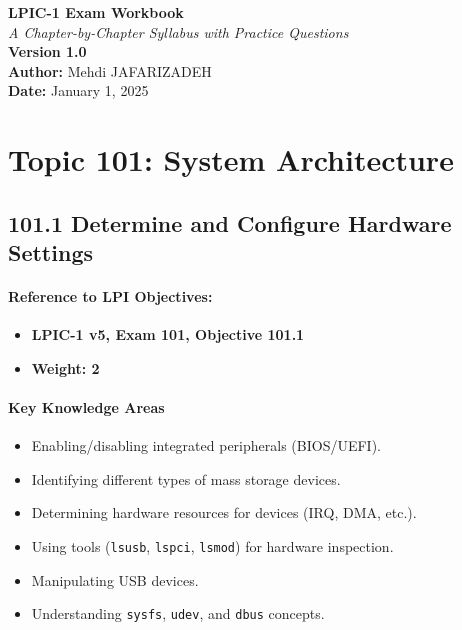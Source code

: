 \documentclass[12pt,a4paper]{report}
\begin{document}
\begin{titlepage}
    \centering
    \vspace*{3cm}
    {\Huge \textbf{LPIC-1 Exam Workbook}}\\
    \vspace{1cm}
    {\large \textit{A Chapter-by-Chapter Syllabus with Practice Questions}}\\
    \vfill
    {\large \textbf{Version 1.0}}\\
    \vspace{2cm}
    \vfill
    \textbf{Author:} Mehdi JAFARIZADEH \\
    \textbf{Date:} January 1, 2025
    \vspace{2cm}
\end{titlepage}

\tableofcontents
\newpage

\chapter{Topic 101: System Architecture}

\section{101.1 Determine and Configure Hardware Settings}

\subsubsection*{Reference to LPI Objectives:}
\begin{itemize}
    \item \textbf{LPIC-1 v5, Exam 101, Objective 101.1}
    \item \textbf{Weight: 2}
\end{itemize}

\subsubsection*{Key Knowledge Areas}
\begin{itemize}
    \item Enabling/disabling integrated peripherals (BIOS/UEFI).
    \item Identifying different types of mass storage devices.
    \item Determining hardware resources for devices (IRQ, DMA, etc.).
    \item Using tools (\texttt{lsusb}, \texttt{lspci}, \texttt{lsmod}) for hardware inspection.
    \item Manipulating USB devices.
    \item Understanding \texttt{sysfs}, \texttt{udev}, and \texttt{dbus} concepts.
\end{itemize}
\end{document}
